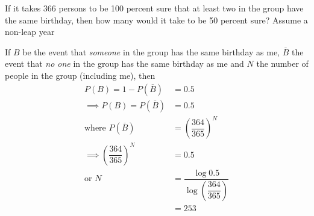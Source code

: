 

\question If it takes 366 persons to be 100 percent sure that at least two in the group
have the same birthday, then how many would it take to be 50 percent sure? Assume a non-leap year


\ifprintanswers
\fi 

\begin{solution}
   If $B$ be the event that \textit{someone} in the group has the same birthday as me,
   $\overline{B}$ the event that \textit{no one} in the group has the same
   birthday as me and $N$ the number of people in the group (including me), then 
   \begin{align}
     P(B) = 1 - P(\overline{B}) &= 0.5 \\
     \implies P(B) = P(\overline{B}) &= 0.5 \\
     \text{where } P(\overline{B}) &= \left(\dfrac{364}{365}\right)^N \\
     \implies \left(\dfrac{364}{365}\right)^N &= 0.5 \\
     \text{or } N &= \dfrac{\log 0.5}{\log\left(\dfrac{364}{365}\right)} \\
       &= 253
   \end{align} 
\end{solution}
\ifprintanswers\begin{codex}\end{codex}\fi
